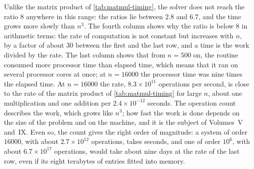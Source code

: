 \begin{table}
\end{table}

Unlike the matrix product of \cref{tab:matmul-timing}, the solver does not reach the ratio $8$ anywhere in this range: the ratios lie between $2.8$ and $6.7$, and the time grows more slowly than $n^3$. The fourth column shows why the ratio is below $8$ in arithmetic terms: the rate of computation is not constant but increases with $n$, by a factor of about $30$ between the first and the last row, and a time is the work divided by the rate. The last column shows that from $n=500$ on, the routine consumed more processor time than elapsed time, which means that it ran on several processor cores at once; at $n=16000$ the processor time was nine times the elapsed time. At $n=16000$ the rate, $8.3\times10^{11}$ operations per second, is close to the rate of the matrix product of \cref{tab:matmul-timing} for large $n$, about one multiplication and one addition per $2.4\times10^{-12}$ seconds. The operation count describes the work, which grows like $n^3$; how fast the work is done depends on the size of the problem and on the machine, and it is the subject of Volumes~V and~IX. Even so, the count gives the right order of magnitude: a system of order $16000$, with about $2.7\times10^{12}$ operations, takes seconds, and one of order $10^6$, with about $6.7\times10^{17}$ operations, would take about nine days at the rate of the last row, even if its eight terabytes of entries fitted into memory.

